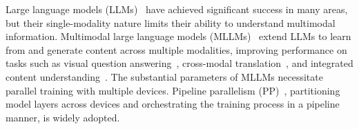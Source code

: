 \documentclass[conference]{IEEEtran}
\begin{document}
Large language models (LLMs)~\cite{brown2020language, devlin2019bert} have achieved significant success in many areas, but their single-modality nature limits their ability to understand multimodal information. 
Multimodal large language models (MLLMs)~\cite{li2022blip, liu2024improved, wu2024next} extend LLMs to learn from and generate content across multiple modalities, improving performance on tasks such as visual question answering~\cite{antol2015vqa}, cross-modal translation~\cite{sulubacak2020multimodal}, and integrated content understanding~\cite{team2023gemini}.
The substantial parameters of MLLMs necessitate parallel training with multiple devices.
Pipeline parallelism (PP)~\cite{huang2019gpipeefficienttraininggiant, narayanan2019pipedream}, partitioning model layers across devices and orchestrating the training process in a pipeline manner, is widely adopted.
\end{document}

